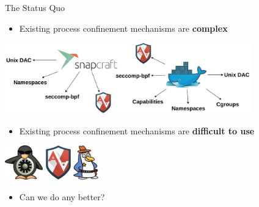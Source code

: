 \documentclass[12pt, dvipsnames]{beamer}
\begin{document}
\begin{frame}[c]{The Status Quo}
\begin{itemize}
    \item Existing process confinement mechanisms are \textbf{complex}
\end{itemize}
\begin{center}
    \color{black}
    \includegraphics[width=0.8\textwidth]{figs/process-confinement-landscape.pdf}
\end{center}
\begin{itemize}
    \item Existing process confinement mechanisms are \textbf{difficult to use}
\end{itemize}
\begin{center}
    \includegraphics[height=4em]{figs/selinux.png}
    \hspace{3em}
    \includegraphics[height=4em]{figs/apparmor.png}
    \hspace{3em}
    \includegraphics[height=4em]{figs/tomoyo.png}
\end{center}
\begin{itemize}
    \item Can we do any better?
\end{itemize}
\end{frame}

\end{document}
